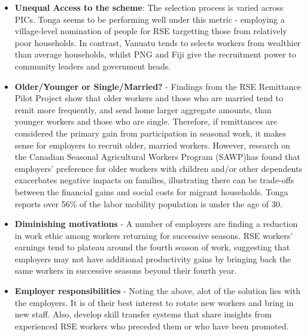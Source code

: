 \documentclass[9pt,a4paper,twocolumn,twoside]{tau-class/tau}
\begin{document}
\begin{itemize}
        \item \textbf{Unequal Access to the scheme}: The selection process is varied across PICs. Tonga seems to be performing well under this metric - employing  a village-level nomination of people for RSE targetting those from relatively poor households. In contrast, Vanuatu tends to selects workers from wealthier than average households, whilst PNG and Fiji give the recruitment power to community leaders and government heads.
        
        

       \item \textbf{Older/Younger or Single/Married?} - Findings from the RSE Remittance Pilot Project show that older workers and those who are married tend to remit more frequently, and send home larger aggregate amounts, than younger workers and those who are single. Therefore, if remittances are considered the primary gain from participation in seasonal work, it makes sense for employers to recruit older, married workers. However, research on the Canadian Seasonal Agricultural Workers Program (SAWP)has found that employers’ preference for older workers with children and/or other dependents exacerbates negative impacts on families, illustrating there can be trade-offs between the financial gains and social costs for migrant households. Tonga reports over 56\% of the labor mobility population is under the age of 30.  

    \item \textbf{Diminishing motivations} - A number of employers are finding a reduction in work ethic among workers returning for successive seasons. RSE workers’ earnings tend to plateau around the fourth season of work, suggesting that employers may not have additional productivity gains by bringing back the same workers in successive seasons beyond their fourth year.



    \item \textbf{Employer responsibilities} - Noting the above, alot of the solution lies with the employers. It is of their best interest to rotate new workers and bring in new staff. Also, develop skill transfer systems that share insights from experienced RSE workers who preceded them or who have been promoted. \end{itemize}
         
\end{document}
